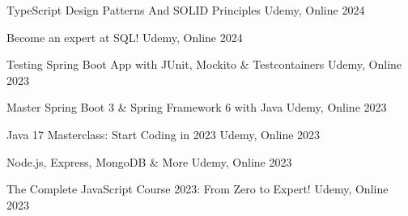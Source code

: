 

\begin{cvhonors}
  
  \cvhonor
    {TypeScript Design Patterns And SOLID Principles} %
    {Udemy, Online} %
    {} %
    {2024} %
  
  \cvhonor
    {Become an expert at SQL!} %
    {Udemy, Online} %
    {} %
    {2024} %

  \cvhonor
    {Testing Spring Boot App with JUnit, Mockito \& Testcontainers} %
    {Udemy, Online} %
    {} %
    {2023} %
    
  \cvhonor
    {Master Spring Boot 3 \& Spring Framework 6 with Java} %
    {Udemy, Online} %
    {} %
    {2023} %
    
  \cvhonor
    {Java 17 Masterclass: Start Coding in 2023} %
    {Udemy, Online} %
    {} %
    {2023} %

  \cvhonor
    {Node.js, Express, MongoDB \& More} %
    {Udemy, Online} %
    {} %
    {2023} %

  \cvhonor
    {The Complete JavaScript Course 2023: From Zero to Expert!} %
    {Udemy, Online} %
    {} %
    {2023} %


\end{cvhonors}
